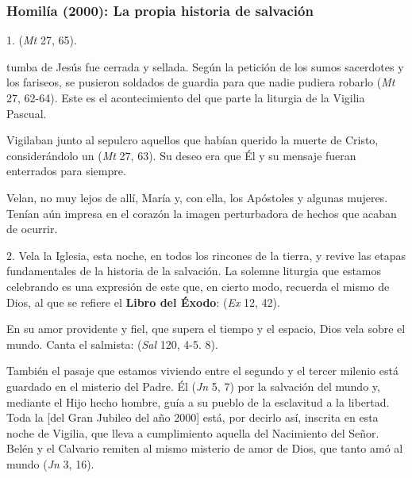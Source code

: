 \newpage 

\subsubsection{Homilía (2000): La propia historia de salvación}


\begin{body}
1.  (\textit{Mt} 27, 65).

 tumba de Jesús fue cerrada y sellada. Según la petición de los sumos sacerdotes y los fariseos, se pusieron soldados de guardia para que nadie pudiera robarlo (\textit{Mt} 27, 62-64). Este es el acontecimiento del que parte la liturgia de la Vigilia Pascual.

Vigilaban junto al sepulcro aquellos que habían querido la muerte de Cristo, considerándolo un  (\textit{Mt} 27, 63). Su deseo era que Él y su mensaje fueran enterrados para siempre.

Velan, no muy lejos de allí, María y, con ella, los Apóstoles y algunas mujeres. Tenían aún impresa en el corazón la imagen perturbadora de hechos que acaban de ocurrir.

2. Vela la Iglesia, esta noche, en todos los rincones de la tierra, y revive las etapas fundamentales de la historia de la salvación. La solemne liturgia que estamos celebrando es una expresión de este  que, en cierto modo, recuerda el mismo de Dios, al que se refiere el \textbf{Libro del Éxodo}:  (\textit{Ex} 12, 42).

En su amor providente y fiel, que supera el tiempo y el espacio, Dios vela sobre el mundo. Canta el salmista:  (\textit{Sal} 120, 4-5. 8).

También el pasaje que estamos viviendo entre el segundo y el tercer milenio está guardado en el misterio del Padre. Él  (\textit{Jn} 5, 7) por la salvación del mundo y, mediante el Hijo hecho hombre, guía a su pueblo de la esclavitud a la libertad. Toda la  [del Gran Jubileo del año 2000] está, por decirlo así, inscrita en esta noche de Vigilia, que lleva a cumplimiento aquella del Nacimiento del Señor. Belén y el Calvario remiten al mismo misterio de amor de Dios, que tanto amó al mundo  (\textit{Jn} 3, 16).


\end{body}
